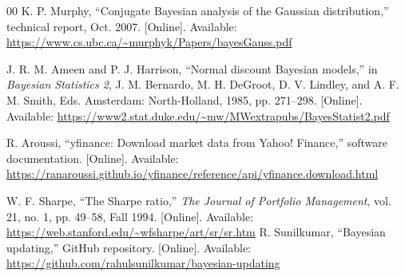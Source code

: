 \documentclass[conference]{IEEEtran}
\begin{document}
\begin{thebibliography}{00}
K. P. Murphy, ``Conjugate Bayesian analysis of the Gaussian distribution,'' technical report, Oct. 2007. [Online]. Available: \url{https://www.cs.ubc.ca/~murphyk/Papers/bayesGauss.pdf}

J. R. M. Ameen and P. J. Harrison, ``Normal discount Bayesian models,'' in \emph{Bayesian Statistics 2}, J. M. Bernardo, M. H. DeGroot, D. V. Lindley, and A. F. M. Smith, Eds. Amsterdam: North-Holland, 1985, pp. 271--298. [Online]. Available: \url{https://www2.stat.duke.edu/~mw/MWextrapubs/BayesStatist2.pdf}

R. Aroussi, ``yfinance: Download market data from Yahoo! Finance,'' software documentation. [Online]. Available: \url{https://ranaroussi.github.io/yfinance/reference/api/yfinance.download.html}

W. F. Sharpe, ``The Sharpe ratio,'' \emph{The Journal of Portfolio Management}, vol. 21, no. 1, pp. 49--58, Fall 1994. [Online]. Available: \url{https://web.stanford.edu/~wfsharpe/art/sr/sr.htm}
R. Sunilkumar, ``Bayesian updating,'' GitHub repository. [Online]. Available: \url{https://github.com/rahulsunilkumar/bayesian-updating}
\end{thebibliography}
\end{document}
